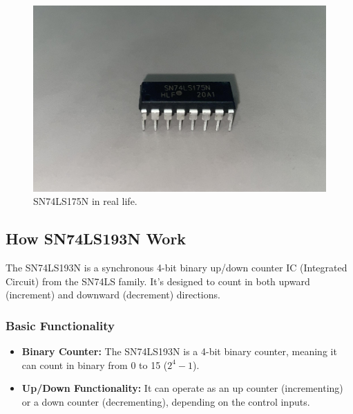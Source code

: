 \documentclass{article}
\begin{document}
\begin{figure}[h]
    \centering
    \includegraphics[width=12cm]{Pic/Pictures/175N real.jpg}
    \caption{SN74LS175N in real life.}
    \label{fig:enter-label}
\end{figure}

\newpage
\subsection{How SN74LS193N Work}
The SN74LS193N is a synchronous 4-bit binary up/down counter IC (Integrated Circuit) from the SN74LS family. It's designed to count in both upward (increment) and downward (decrement) directions.

\subsubsection{Basic Functionality}

\begin{itemize}
    \item \textbf{Binary Counter:} The SN74LS193N is a 4-bit binary counter, meaning it can count in binary from 0 to 15 ($2^4 - 1$).
    \item \textbf{Up/Down Functionality:} It can operate as an up counter (incrementing) or a down counter (decrementing), depending on the control inputs.
\end{itemize}
\end{document}
